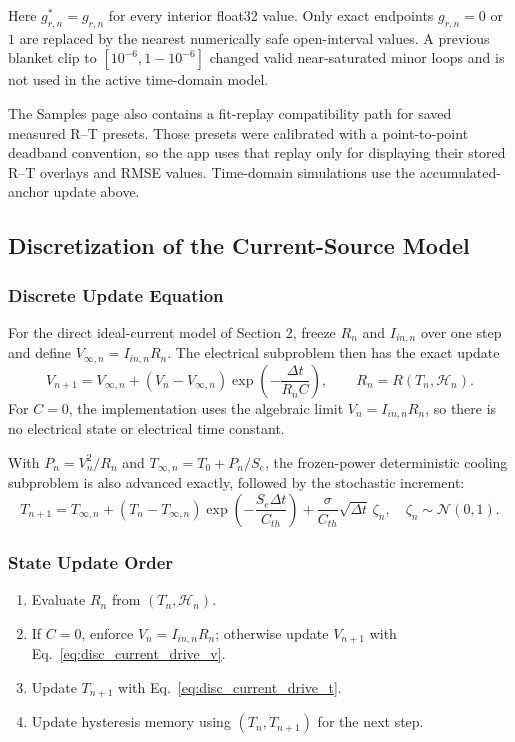 \documentclass[11pt]{article}
\begin{document}
Here \(g^*_{r,n}=g_{r,n}\) for every interior float32 value. Only exact
endpoints \(g_{r,n}=0\) or \(1\) are replaced by the nearest numerically safe
open-interval values. A previous blanket clip to
\([10^{-6},1-10^{-6}]\) changed valid near-saturated minor loops and is not
used in the active time-domain model.

The Samples page also contains a fit-replay compatibility path for saved measured R--T presets. Those presets were calibrated with a point-to-point deadband convention, so the app uses that replay only for displaying their stored R--T overlays and RMSE values. Time-domain simulations use the accumulated-anchor update above.

\subsection{Discretization of the Current-Source Model}
\subsubsection*{Discrete Update Equation}
For the direct ideal-current model of Section 2, freeze \(R_n\) and
\(I_{in,n}\) over one step and define \(V_{\infty,n}=I_{in,n}R_n\). The
electrical subproblem then has the exact update
\begin{equation}
V_{n+1}
=
V_{\infty,n}+(V_n-V_{\infty,n})
\exp\!\left(-\frac{\Delta t}{R_nC}\right),
\qquad
R_n=R(T_n,\mathcal{H}_n).
\label{eq:disc_current_drive_v}
\end{equation}
For \(C=0\), the implementation uses the algebraic limit
\(V_n=I_{in,n}R_n\), so there is no electrical state or electrical time
constant.

With \(P_n=V_n^2/R_n\) and
\(T_{\infty,n}=T_0+P_n/S_e\), the frozen-power deterministic cooling
subproblem is also advanced exactly, followed by the stochastic increment:
\begin{equation}
T_{n+1}
=
T_{\infty,n}+(T_n-T_{\infty,n})
\exp\!\left(-\frac{S_e\Delta t}{C_{th}}\right)
+\frac{\sigma}{C_{th}}\sqrt{\Delta t}\,\zeta_n,
\quad
\zeta_n\sim\mathcal{N}(0,1).
\label{eq:disc_current_drive_t}
\end{equation}

\subsubsection*{State Update Order}
\begin{enumerate}
    \item Evaluate \(R_n\) from \((T_n,\mathcal{H}_n)\).
    \item If \(C=0\), enforce \(V_n=I_{in,n}R_n\); otherwise update
    \(V_{n+1}\) with Eq.~\eqref{eq:disc_current_drive_v}.
    \item Update \(T_{n+1}\) with Eq.~\eqref{eq:disc_current_drive_t}.
    \item Update hysteresis memory using \((T_n,T_{n+1})\) for the next step.
\end{enumerate}
\end{document}
